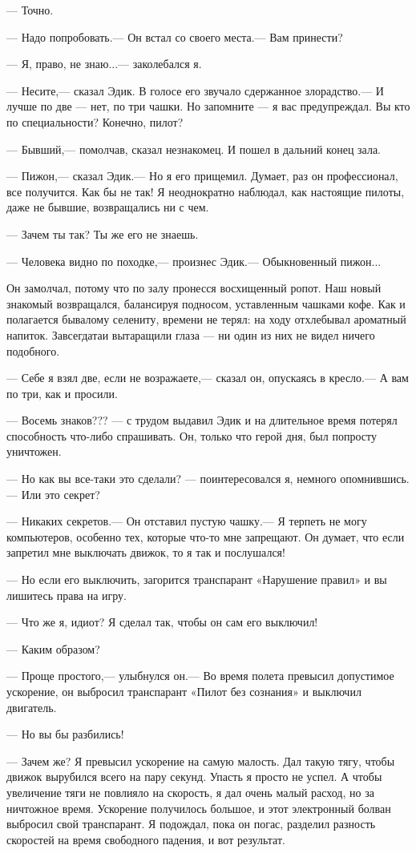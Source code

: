 \documentclass[11pt,a4paper,oneside]{article}
\begin{document}
— Точно.

— Надо попробовать.— Он встал со своего места.— Вам принести?

— Я, право, не знаю...— заколебался я.

— Несите,— сказал Эдик. В голосе его звучало сдержанное злорадство.— И лучше по две — нет, по три чашки. Но запомните — я вас предупреждал. Вы кто по специальности? Конечно, пилот?

— Бывший,— помолчав, сказал незнакомец. И пошел в дальний конец зала.

— Пижон,— сказал Эдик.— Но я его прищемил. Думает, раз он профессионал, все получится. Как бы не так! Я неоднократно наблюдал, как настоящие пилоты, даже не бывшие, возвращались ни с чем.

— Зачем ты так? Ты же его не знаешь.

— Человека видно по походке,— произнес Эдик.— Обыкновенный пижон...

Он замолчал, потому что по залу пронесся восхищенный ропот. Наш новый знакомый возвращался, балансируя подносом, уставленным чашками кофе. Как и полагается бывалому селениту, времени не терял: на ходу отхлебывал ароматный напиток. Завсегдатаи вытаращили глаза — ни один из них не видел ничего подобного.

— Себе я взял две, если не возражаете,— сказал он, опускаясь в кресло.— А вам по три, как и просили.

— Восемь знаков??? — с трудом выдавил Эдик и на длительное время потерял способность что-либо спрашивать. Он, только что герой дня, был попросту уничтожен.

— Но как вы все-таки это сделали? — поинтересовался я, немного опомнившись.— Или это секрет?

— Никаких секретов.— Он отставил пустую чашку.— Я терпеть не могу компьютеров, особенно тех, которые что-то мне запрещают. Он думает, что если запретил мне выключать движок, то я так и послушался!

— Но если его выключить, загорится транспарант «Нарушение правил» и вы лишитесь права на игру.

— Что же я, идиот? Я сделал так, чтобы он сам его выключил!

— Каким образом?

— Проще простого,— улыбнулся он.— Во время полета превысил допустимое ускорение, он выбросил транспарант «Пилот без сознания» и выключил двигатель.

— Но вы бы разбились!

— Зачем же? Я превысил ускорение на самую малость. Дал такую тягу, чтобы движок вырубился всего на пару секунд. Упасть я просто не успел. А чтобы увеличение тяги не повлияло на скорость, я дал очень малый расход, но за ничтожное время. Ускорение получилось большое, и этот электронный болван выбросил свой транспарант. Я подождал, пока он погас, разделил разность скоростей на время свободного падения, и вот результат.
\end{document}
